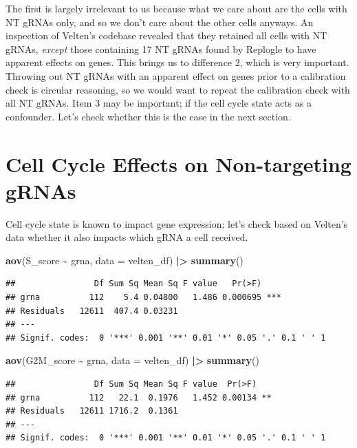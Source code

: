 \documentclass[
]{article}
\newenvironment{Shaded}{\begin{snugshade}}{\end{snugshade}}
\newcommand{\AttributeTok}[1]{\textcolor[rgb]{0.13,0.29,0.53}{#1}}
\newcommand{\FunctionTok}[1]{\textcolor[rgb]{0.13,0.29,0.53}{\textbf{#1}}}
\newcommand{\NormalTok}[1]{#1}
\newcommand{\SpecialCharTok}[1]{\textcolor[rgb]{0.81,0.36,0.00}{\textbf{#1}}}
\begin{document}
The first is largely irrelevant to us because what we care about are the
cells with NT gRNAs only, and so we don't care about the other cells
anyways. An inspection of Velten's codebase revealed that they retained
all cells with NT gRNAs, \emph{except} those containing 17 NT gRNAs
found by Replogle to have apparent effects on genes. This brings us to
difference 2, which is very important. Throwing out NT gRNAs with an
apparent effect on genes prior to a calibration check is circular
reasoning, so we would want to repeat the calibration check with all NT
gRNAs. Item 3 may be important; if the cell cycle state acts as a
confounder. Let's check whether this is the case in the next section.

\section{Cell Cycle Effects on Non-targeting
gRNAs}\label{cell-cycle-effects-on-non-targeting-grnas}

Cell cycle state is known to impact gene expression; let's check based
on Velten's data whether it also impacts which gRNA a cell received.

\begin{Shaded}
\begin{Highlighting}[]
\FunctionTok{aov}\NormalTok{(S\_score }\SpecialCharTok{\textasciitilde{}}\NormalTok{ grna, }\AttributeTok{data =}\NormalTok{ velten\_df) }\SpecialCharTok{|\textgreater{}} \FunctionTok{summary}\NormalTok{()}
\end{Highlighting}
\end{Shaded}

\begin{verbatim}
##                Df Sum Sq Mean Sq F value   Pr(>F)    
## grna          112    5.4 0.04800   1.486 0.000695 ***
## Residuals   12611  407.4 0.03231                     
## ---
## Signif. codes:  0 '***' 0.001 '**' 0.01 '*' 0.05 '.' 0.1 ' ' 1
\end{verbatim}

\begin{Shaded}
\begin{Highlighting}[]
\FunctionTok{aov}\NormalTok{(G2M\_score }\SpecialCharTok{\textasciitilde{}}\NormalTok{ grna, }\AttributeTok{data =}\NormalTok{ velten\_df) }\SpecialCharTok{|\textgreater{}} \FunctionTok{summary}\NormalTok{()}
\end{Highlighting}
\end{Shaded}

\begin{verbatim}
##                Df Sum Sq Mean Sq F value  Pr(>F)   
## grna          112   22.1  0.1976   1.452 0.00134 **
## Residuals   12611 1716.2  0.1361                   
## ---
## Signif. codes:  0 '***' 0.001 '**' 0.01 '*' 0.05 '.' 0.1 ' ' 1
\end{verbatim}
\end{document}
